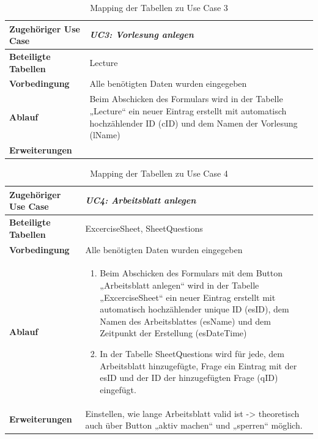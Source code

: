 \begin{table}[h]
	\begin{tabular}{|p{3cm}|p{11.06cm}|}
	\hline
		\textbf{Zugehöriger Use Case}                 &    \emph{UC3: Vorlesung anlegen} \prettyref{uc:UC3}     \\ \hline
		\textbf{Beteiligte Tabellen}      &     Lecture    \\ \hline
		\textbf{Vorbedingung}              &    Alle benötigten Daten wurden eingegeben     \\ \hline
		\textbf{Ablauf}              &   Beim Abschicken des Formulars wird in der Tabelle „Lecture“ ein neuer Eintrag erstellt mit automatisch hochzählender ID (cID) und dem Namen der Vorlesung (lName) \\ \hline
		\textbf{Erweiterungen}              &         \\ \hline
	\end{tabular}
	\caption{Mapping der Tabellen zu Use Case 3}
\end{table}\FloatBarrier

\begin{table}[h]
	\begin{tabular}{|p{3cm}|p{11.06cm}|}
	\hline
		\textbf{Zugehöriger Use Case}                 &    \emph{UC4: Arbeitsblatt anlegen} \prettyref{uc:UC4}     \\ \hline
		\textbf{Beteiligte Tabellen}      &    ExcerciseSheet, SheetQuestions     \\ \hline
		\textbf{Vorbedingung}              &    Alle benötigten Daten wurden eingegeben     \\ \hline
		\textbf{Ablauf}              &   
			\begin{enumerate}
			  \item Beim Abschicken des Formulars mit dem Button „Arbeitsblatt anlegen“ wird in der Tabelle „ExcerciseSheet“ ein neuer Eintrag erstellt mit automatisch hochzählender unique ID (esID), dem Namen des Arbeitsblattes (esName) und dem Zeitpunkt der Erstellung (esDateTime)
			  \item In der Tabelle SheetQuestions wird für jede, dem Arbeitsblatt hinzugefügte, Frage ein Eintrag mit der esID und der ID der hinzugefügten Frage (qID)  eingefügt.
			\end{enumerate}
		\\ \hline
		\textbf{Erweiterungen}              &     Einstellen, wie lange Arbeitsblatt valid ist -> theoretisch auch über Button „aktiv machen“ und „sperren“ möglich.    \\ \hline
	\end{tabular}
	\caption{Mapping der Tabellen zu Use Case 4}
\end{table}\FloatBarrier

